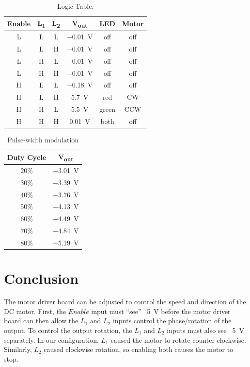 \begin{table}[hbtp]
  \centering
  \begin{tabular}{ccc|ccc}
    Enable & \si{L_1} & \si{L_2} & \si{V_{out}} & LED & Motor \\
    \hline
    L & L & L & \SI{-0.01}{V} & off   & off \\
    L & L & H & \SI{-0.01}{V} & off   & off \\
    L & H & L & \SI{-0.01}{V} & off   & off \\
    L & H & H & \SI{-0.01}{V} & off   & off \\
    H & L & L & \SI{-0.18}{V} & off   & off \\
    H & L & H & \SI{+5.7}{V}  & red   & CW  \\
    H & H & L & \SI{+5.5}{V}  & green & CCW \\
    H & H & H & \SI{+0.01}{V} & both  & off \\
  \end{tabular}
  \caption{\label{tab:logic} Logic Table. }
\end{table}

\begin{table}[hbtp]
  \centering
  \begin{tabular}{cc}
    Duty Cycle & \si{V_{out}} \\
    \hline
    20\% & \SI{-3.01}{V} \\
    30\% & \SI{-3.39}{V} \\
    40\% & \SI{-3.76}{V} \\
    50\% & \SI{-4.13}{V} \\
    60\% & \SI{-4.49}{V} \\
    70\% & \SI{-4.84}{V} \\
    80\% & \SI{-5.19}{V} \\
  \end{tabular}
  \caption{\label{tab:duty} Pulse-width modulation}
\end{table}

\section{Conclusion}
\label{sec:conclusion}

The motor driver board can be adjusted to control the speed and direction of the DC motor.  First, the $Enable$ input must ``see'' ~\SI{5}{V} before the motor driver board can then allow the $L_1$ and $L_2$ inputs control the phase/rotation of the output.  To control the output rotation, the $L_1$ and $L_2$ inputs must also see ~\SI{5}{V} separately.  In our configuration, $L_1$ caused the motor to rotate counter-clockwise.  Similarly, $L_2$ caused clockwise rotation, so enabling both causes the motor to stop.


